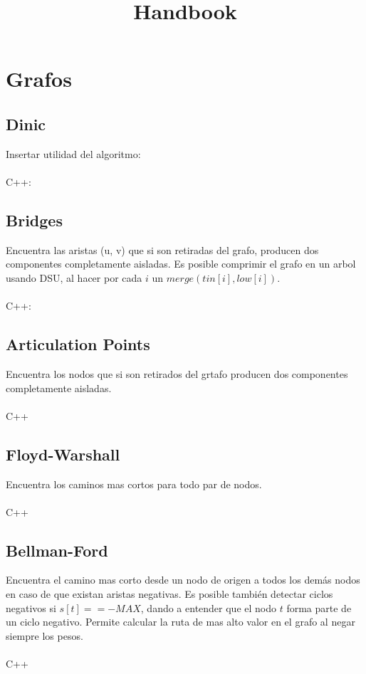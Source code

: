 \documentclass{article}
\title{Handbook}
\begin{document}
\maketitle
\tableofcontents
\pagebreak
\section{Grafos}
    \subsection{Dinic}
        Insertar utilidad del algoritmo:
        \\ \\
        C++:
        

    \subsection{Bridges}
        Encuentra las aristas (u, v) que si son retiradas del grafo, producen dos
        componentes completamente aisladas. Es posible comprimir el grafo en un arbol
        usando DSU, al hacer por cada $i$ un $merge(tin[i], low[i])$.
        \\ \\
        C++:
        

    \subsection{Articulation Points}
        Encuentra los nodos que si son retirados del grtafo producen dos componentes completamente aisladas.
        \\ \\
        C++
        

    \subsection{Floyd-Warshall}
        Encuentra los caminos mas cortos para todo par de nodos.\\ \\
        C++
        

    \subsection{Bellman-Ford}
        Encuentra el camino mas corto desde un nodo de origen a todos los demás nodos
        en caso de que existan aristas negativas. Es posible también detectar ciclos negativos
        si $s[t] == -MAX$, dando a entender que el nodo $t$ forma parte de un ciclo negativo.
        Permite calcular la ruta de mas alto valor en el grafo al negar siempre los pesos.
        \\ \\
        C++
        
\end{document}
